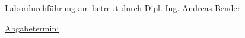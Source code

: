 

\textblockorigin{0mm}{0mm}

\makeatletter
\begin{titlepage}

    
    \begin{center}
        

        \vspace*{0.5cm}
        \large{\@author}

        \Huge{\@title}\\[3ex]

        \Large{\@subtitle}\\[1ex]


        \vspace*{5cm}

        Labordurchführung am \labdate{} betreut durch Dipl.-Ing. Andreas Bender

        \vspace*{5cm}

        \normalsize

        \underline{Abgabetermin:} \\
        \abgabetermin

        \vspace*{1cm}

            
    \end{center}
\end{titlepage}
\makeatother